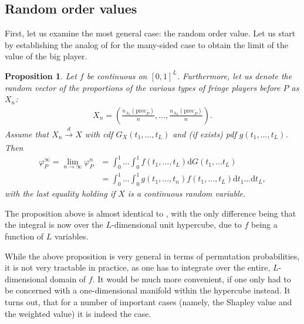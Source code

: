 \documentclass[a4paper]{article}
\newtheorem{proposition}{Proposition}
\newcommand{\dt}{\mathrm{d}t}
\newcommand{\dG}{\mathrm{d}G}
\newcommand{\precede}{\mathrm{prec}}
\begin{document}
\subsection{Random order values}

First, let us examine the most general case: the random order value.
Let us start by establishing the analog of  for the many-sided case to obtain the limit of the value of the big player.
\begin{proposition}
    \label{prop:many_sided_general}
    Let $f$ be continuous on $[0, 1]^L$. Furthermore, let us denote the random vector of the proportions of the various types of fringe players before $P$ as $X_n$:
    \begin{align*}
        X_n = \left( \frac{n_{A_1}(\precede_P)}{n}, \dots, \frac{n_{A_L}(\precede_P)}{n} \right).
    \end{align*}
    Assume that $X_n \xrightarrow[]{d} X$ with cdf $G_X(t_1, \dots, t_L)$ and (if exists) pdf $g(t_1, \dots, t_L)$.
    Then
    \begin{align*}
        \varphi_P^\infty = \lim_{n \to \infty} \varphi_P^n &= \int_0^1 \dots \int_0^1 f(t_1, \dots, t_L) \dG(t_1, \dots t_L) \\
        &= \int_0^1\dots \int_0^1 g(t_1, \dots, t_n) f(t_1, \dots, t_L) \dt_1 \dots \dt_L,
    \end{align*}
    with the last equality holding if $X$ is a continuous random variable.
\end{proposition}
The proposition above is almost identical to , with the only difference being that the integral is now over the $L$-dimensional unit hypercube, due to $f$ being a function of $L$ variables.

While the above proposition is very general in terms of permutation probabilities, it is not very tractable in practice, as one has to integrate over the entire, $L$-dimensional domain of $f$.
It would be much more convenient, if one only had to be concerned with a one-dimensional manifold within the hypercube instead.
It turns out, that for a number of important cases (namely, the Shapley value and the weighted value) it is indeed the case.
\end{document}
